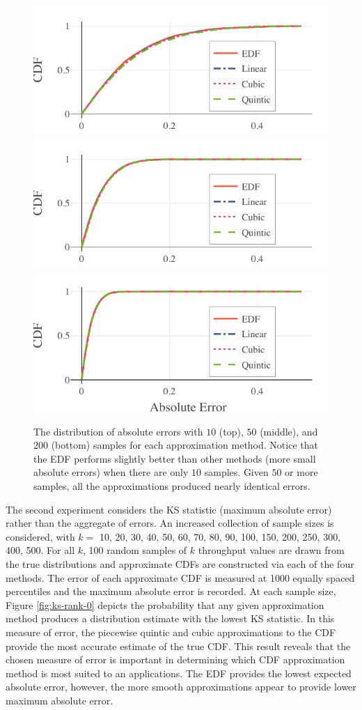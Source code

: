\documentclass[letterpaper, 10 pt, conference]{ieeeconf}  %
\begin{document}
\begin{figure}
  \vspace{-.3cm}
  \includegraphics[width=.45\textwidth]{abs-errors-10-samples.pdf}
  \includegraphics[width=.45\textwidth]{abs-errors-50-samples.pdf}
  \includegraphics[width=.45\textwidth]{abs-errors-200-samples.pdf}
  \caption{The distribution of absolute errors with $10$ (top), $50$ (middle), and $200$ (bottom) samples for each approximation method. Notice that the EDF performs slightly better than other methods (more small absolute errors) when there are only $10$ samples. Given $50$ or more samples, all the approximations produced nearly identical errors.
  \vspace{-.5cm}}
  \label{fig:abs-error-dist}
\end{figure}

The second experiment considers the KS statistic (maximum absolute error) rather than the aggregate of errors. An increased collection of sample sizes is considered, with $k =$ 10, 20, 30, 40, 50, 60, 70, 80, 90, 100, 150, 200, 250, 300, 400, 500. For all $k$, 100 random samples of $k$ throughput values are drawn from the true distributions and approximate CDFs are constructed via each of the four methods. The error of each approximate CDF is measured at 1000 equally spaced percentiles and the maximum absolute error is recorded. At each sample size, Figure \ref{fig:ks-rank-0} depicts the probability that any given approximation method produces a distribution estimate with the lowest KS statistic. In this measure of error, the piecewise quintic and cubic approximations to the CDF provide the most accurate estimate of the true CDF. This result reveals that the chosen measure of error is important in determining which CDF approximation method is most suited to an applications. The EDF provides the lowest expected absolute error, however, the more smooth approximations appear to provide lower maximum absolute error.
\end{document}
